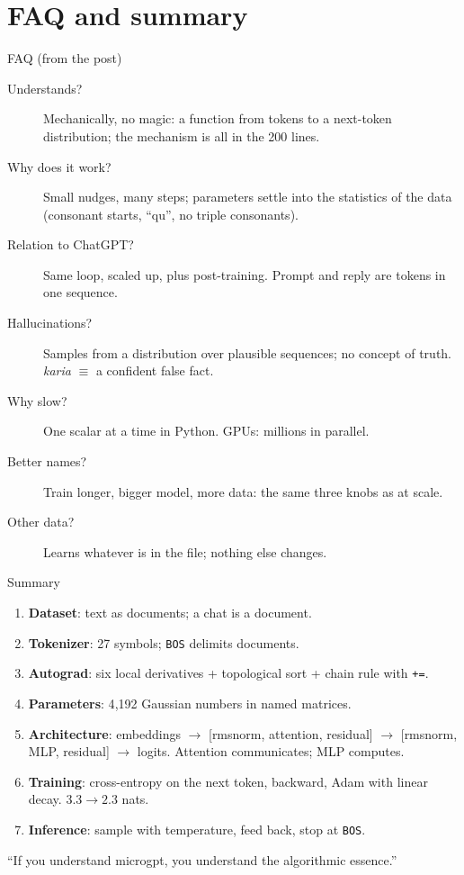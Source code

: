 \documentclass[aspectratio=169,11pt]{beamer}
\begin{document}
\section{FAQ and summary}
\begin{frame}{FAQ (from the post)}
\begin{description}
  \item[Understands?] Mechanically, no magic: a function from tokens to a next-token distribution; the mechanism is all in the 200 lines.
  \item[Why does it work?] Small nudges, many steps; parameters settle into the statistics of the data (consonant starts, ``qu'', no triple consonants).
  \item[Relation to ChatGPT?] Same loop, scaled up, plus post-training. Prompt and reply are tokens in one sequence.
  \item[Hallucinations?] Samples from a distribution over plausible sequences; no concept of truth. \emph{karia} $\equiv$ a confident false fact.
  \item[Why slow?] One scalar at a time in Python. GPUs: millions in parallel.
  \item[Better names?] Train longer, bigger model, more data: the same three knobs as at scale.
  \item[Other data?] Learns whatever is in the file; nothing else changes.
\end{description}
\end{frame}

\begin{frame}{Summary}
\begin{enumerate}
  \item \textbf{Dataset}: text as documents; a chat is a document.
  \item \textbf{Tokenizer}: 27 symbols; \texttt{BOS} delimits documents.
  \item \textbf{Autograd}: six local derivatives + topological sort + chain rule with \texttt{+=}.
  \item \textbf{Parameters}: 4{,}192 Gaussian numbers in named matrices.
  \item \textbf{Architecture}: embeddings $\to$ [rmsnorm, attention, residual] $\to$ [rmsnorm, MLP, residual] $\to$ logits. Attention communicates; MLP computes.
  \item \textbf{Training}: cross-entropy on the next token, backward, Adam with linear decay. $3.3\to 2.3$ nats.
  \item \textbf{Inference}: sample with temperature, feed back, stop at \texttt{BOS}.
\end{enumerate}
\begin{block}{}
``If you understand microgpt, you understand the algorithmic essence.''
\end{block}
\end{frame}
\end{document}

